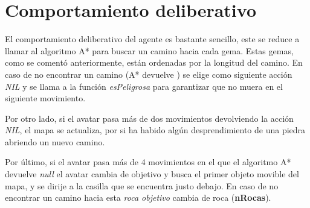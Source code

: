 \documentclass[size=a4, parskip=half, titlepage=false, toc=flat, toc=bib, 12pt]{scrartcl}
\begin{document}
\newpage

\section{Comportamiento deliberativo}
El comportamiento deliberativo del agente es bastante sencillo, este se reduce
a llamar al algoritmo A* para buscar un camino hacia cada gema. Estas gemas,
como se comentó anteriormente, están ordenadas por la longitud del camino.
En caso de no encontrar un camino (A* devuelve ) se elige como
siguiente acción \textit{NIL} y se llama a la función \textit{esPeligrosa}
para garantizar que no muera en el siguiente movimiento.

Por otro lado, si el avatar pasa más de dos movimientos devolviendo la acción
\textit{NIL}, el mapa se actualiza, por si ha habido algún desprendimiento de
una piedra abriendo un nuevo camino.

Por último, si el avatar pasa más de 4 movimientos en el que el algoritmo A*
devuelve \textit{null} el avatar cambia de objetivo y busca el primer objeto
movible del mapa, y se dirije a la casilla que se encuentra justo debajo. En
caso de no encontrar un camino hacia esta \textit{roca objetivo} cambia de
roca (\textbf{nRocas}).

\begin{algorithm}

\end{algorithm}
\end{document}

